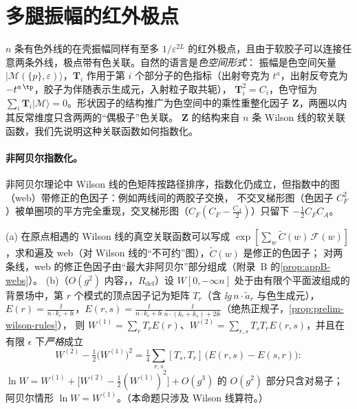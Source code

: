 \section{多腿振幅的红外极点}\label{sec:sudakov-multileg}

$n$ 条有色外线的在壳振幅同样有至多 $1/\varepsilon^{2L}$ 的红外极点，且由于软胶子可以连接任意两条外线，极点带有色关联。自然的语言是\emph{色空间形式}：
振幅是色空间矢量 $|\mathcal M(\{p\},\varepsilon)\rangle$，$\mathbf T_i$ 作用于第 $i$ 个部分子的色指标（出射夸克为 $t^a$，出射反夸克为 $-t^{a\,\tp}$，胶子为伴随表示生成元，入射粒子取共轭），
$\mathbf T_i^2=C_i$，色守恒为 $\sum_i\mathbf T_i|\mathcal M\rangle=0$。形状因子的结构推广为色空间中的乘性重整化因子 $\mathbf Z$，两圈以内其反常维度只含两两的“偶极子”色关联。
$\mathbf Z$ 的结构来自 $n$ 条 Wilson 线的软关联函数，我们先说明这种关联函数如何指数化。

\paragraph{非阿贝尔指数化。}非阿贝尔理论中 Wilson 线的色矩阵按路径排序，指数化仍成立，但指数中的图（web）带修正的色因子：例如两线间的两胶子交换，
不交叉梯形图（色因子 $C_F^2$）被单圈项的平方完全重现，交叉梯形图（$C_F(C_F-\frac{C_A}2)$）只留下 $-\frac12C_FC_A$。%

\begin{proposition}\label{prop:sudakov-webs}
(a) 在原点相遇的 Wilson 线的真空关联函数可以写成 $\exp[\sum_w\tilde C(w)\,\mathcal F(w)]$，求和遍及 web（对 Wilson 线的“不可约”图），$\tilde C(w)$ 是修正的色因子；
对两条线，web 的修正色因子由“最大非阿贝尔”部分组成\cite{Gatheral1983,FrenkelTaylor1984}（附录~B 的\cref{prop:appB-webs}）。
(b)（$O(g^2)$ 内容，\tagR，$R_{\mathrm{def}}$）设 $W[0,-\infty n]$ 处于由有限个平面波组成的背景场中，第 $r$ 个模式的顶点因子记为矩阵 $T_r$（含 $\ii g\,n\cdot\tilde a_r$ 与色生成元），
$E(r)=\frac{\ii}{n\cdot k_r+\ii\epsilon}$，$E(r,s)=\frac{\ii}{n\cdot k_r+\ii\epsilon}\frac{\ii}{n\cdot(k_r+k_s)+2\ii\epsilon}$（绝热正规子，\cref{prop:prelim-wilson-rules}），
则 $W^{(1)}=\sum_rT_rE(r)$、$W^{(2)}=\sum_{r,s}T_sT_rE(r,s)$，并且在有限 $\epsilon$ 下\emph{严格}成立
\begin{equation}\label{eq:sudakov-web2}
W^{(2)}-\tfrac12\big(W^{(1)}\big)^2=\tfrac14\sum_{r,s}[T_s,T_r]\,\big(E(r,s)-E(s,r)\big):
\end{equation}
$\ln W=W^{(1)}+\big[W^{(2)}-\frac12(W^{(1)})^2\big]+O(g^3)$ 的 $O(g^2)$ 部分只含对易子；阿贝尔情形 $\ln W=W^{(1)}$。（本命题只涉及 Wilson 线算符。）
\end{proposition}

